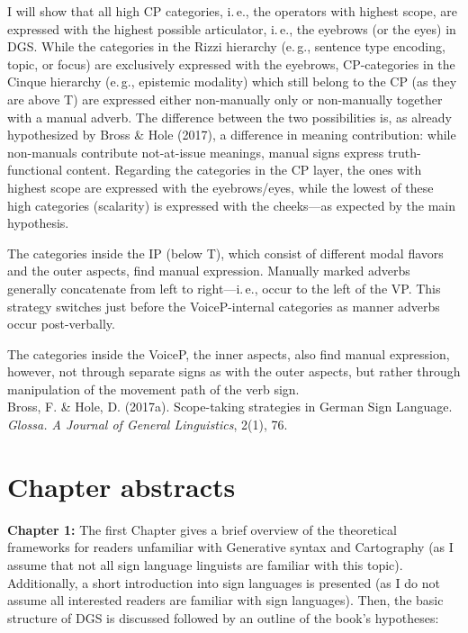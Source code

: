\documentclass[a4paper,DIV=calc,11pt]{scrartcl}
\begin{document}
I will show that all high CP categories, i.\,e., the operators with highest scope, are expressed with the highest possible articulator, i.\,e., the eyebrows (or the eyes) in DGS. While the categories in the Rizzi hierarchy (e.\,g., sentence type encoding, topic, or focus) are exclusively expressed with the eyebrows, CP-categories in the Cinque hierarchy (e.\,g., epistemic modality) which still belong to the CP (as they are above T) are expressed either non-manually only or non-manually together with a manual adverb. The difference between the two possibilities is, as already hypothesized by Bross \& Hole (2017), a difference in meaning contribution: while non-manuals contribute not-at-issue meanings, manual signs express truth-functional content. Regarding the categories in the CP layer, the ones with highest scope are expressed with the eyebrows/eyes, while the lowest of these high categories (scalarity) is expressed with the cheeks---as expected by the main hypothesis. 

The categories inside the IP (below T), which consist of different modal flavors and the outer aspects, find manual expression. Manually marked adverbs generally concatenate from left to right---i.\,e., occur to the left of the VP. This strategy switches just before the VoiceP-internal categories as manner adverbs occur post-verbally. 

The categories inside the VoiceP, the inner aspects, also find manual expression, however, not through separate signs as with the outer aspects, but rather through manipulation of the movement path of the verb sign.\\


\noindent Bross, F. \& Hole, D. (2017a). Scope-taking strategies in German Sign Language. \textit{Glossa. A Journal of General Linguistics}, 2(1), 76.

\clearpage
\section*{Chapter abstracts}
\noindent \textbf{Chapter 1:} The first Chapter gives a brief overview of the theoretical frameworks for readers unfamiliar with Generative syntax and Cartography (as I assume that not all sign language linguists are familiar with this topic). Additionally, a short introduction into sign languages is presented (as I do not assume all interested readers are familiar with sign languages). Then, the basic structure of DGS is discussed followed by an outline of the book's hypotheses:
\end{document}
